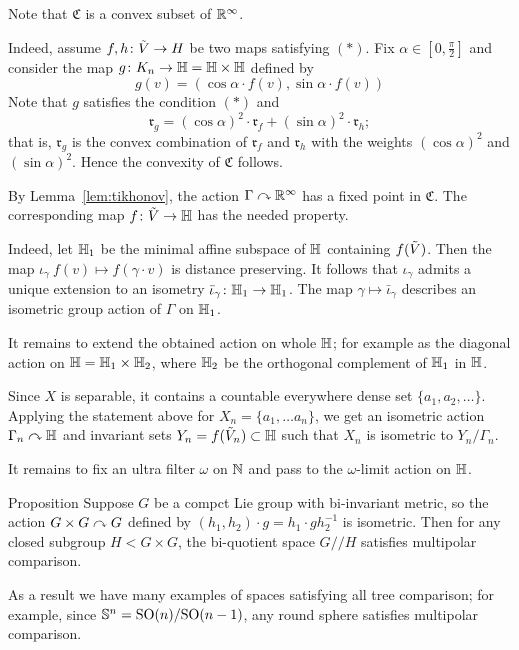 Note that $\mathfrak{C}$ is a convex subset of $\RR^\infty$.

Indeed, assume $f,h\:\~V\to H$ be two maps satisfying $({*})$.
Fix $\alpha\in[0,\tfrac\pi2]$ and 
consider the map $g\:K_n\to \HH=\HH\times \HH$ defined by
\[g(v)=(\cos\alpha\cdot f(v),\sin\alpha\cdot f(v))\]
Note that $g$ satisfies the condition $({*})$ and 
\[\mathfrak{r}_g=(\cos\alpha)^2\cdot\mathfrak{r}_f+(\sin\alpha)^2\cdot\mathfrak{r}_h;\]
that is, $\mathfrak{r}_g$ is the convex combination of  $\mathfrak{r}_f$ and $\mathfrak{r}_h$ with the weights  $(\cos\alpha)^2$ and $(\sin\alpha)^2$.
Hence the convexity of $\mathfrak{C}$ follows.

By Lemma~\ref{lem:tikhonov}, the action $\Gamma\acts\RR^\infty$ has a fixed point in $\mathfrak{C}$.
The corresponding map $f\:\~V\to \HH$ has the needed property.

Indeed, let $\HH_1$ be the minimal affine subspace of $\HH$ containing $f(\~V)$.
Then the map $\iota_\gamma\:f(v)\mapsto f(\gamma\cdot v)$ is distance preserving.
It follows that $\iota_\gamma$ admits a unique extension to an isometry $\bar\iota_\gamma\:\HH_1\to\HH_1$.
The map $\gamma\mapsto \bar \iota_\gamma$ describes an isometric group action of $\Gamma$ on $\HH_1$.

It remains to extend the obtained action on whole $\HH$;
for example as the diagonal action on $\HH=\HH_1\times\HH_2$,
where $\HH_2$ be the orthogonal complement of $\HH_1$ in $\HH$.

Since $X$ is separable, it contains a countable everywhere dense set $\{a_1,a_2,\dots\}$. 
Applying the statement above for $X_n=\{a_1,\dots a_n\}$, we get an isometric action $\Gamma_n\acts\HH$ and invariant sets $Y_n=f(\~V_n)\subset \HH$ such that $X_n$ is isometric to $Y_n/\Gamma_n$.

It remains to fix an ultra filter $\omega$ on $\NN$ and pass to the $\omega$-limit action on $\HH$. %
\qeds

\begin{thm}{Proposition}
Suppose $G$ be a compct Lie group with bi-invariant metric, so the action $G\times G\acts G$ defined by $(h_1,h_2)\cdot g=h_1\cdot g h_2^{-1}$ is isometric. 
Then for any closed subgroup $H<G\times G$, the bi-quotient space $G/\!\!/H$ satisfies multipolar comparison.
\end{thm}

As a result we have many examples of spaces satisfying all tree comparison;
for example, since $\SS^n=\SO(n)/\SO(n-1)$, any round sphere satisfies multipolar comparison.


